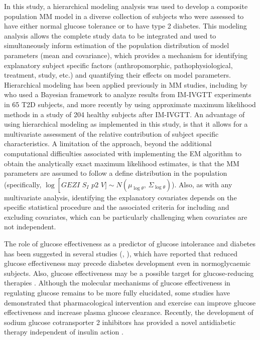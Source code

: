 \documentclass[utf8]{frontiersSCNS} %
\begin{document}
In this study, a hierarchical modeling analysis was used to develop a composite population MM model in a diverse collection of subjects who were assessed to have either normal glucose tolerance or to have type 2 diabetes. This modeling analysis allows the complete study data to be integrated and used to simultaneously inform estimation of the population distribution of model parameters (mean and covariance), which provides a mechanism for identifying explanatory subject specific factors (anthropomorphic, pathophysiological, treatment, study, etc.) and quantifying their effects on model parameters. Hierarchical modeling has been applied previously in MM studies, including by \citet{agbaje_2003} who used a Bayesian framework to analyze results from IM-IVGTT experiments in 65 T2D subjects, and more recently by \citet{Denti2010} using approximate maximum likelihood methods in a study of 204 healthy subjects after IM-IVGTT. An advantage of using hierarchical modeling as implemented in this study, is that it allows for a multivariate assessment of the relative contribution of subject specific characteristics. A limitation of the approach, beyond the additional computational difficulties associated with implementing the EM algorithm to obtain the analytically exact maximum likelihood estimates, is that the MM parameters are assumed to follow a define distribution in the population (specifically, $\log \left[ GEZI\,\,{S_I}\,\,p2\,\,V] \sim N\left( {\mu_{\log \theta }},\,{\Sigma_{\log \theta}} \right)$). Also, as with any multivariate analysis, identifying the explanatory covariates depends on the specific statistical procedure and the associated criteria for including and excluding covariates, which can be particularly challenging when covariates are not independent.

The role of glucose effectiveness as a predictor of glucose intolerance and diabetes has been suggested in several studies (\citet{Martin1992}, \citet{lorenzo_2010}), which have reported that reduced glucose effectiveness may precede diabetes development even in normoglycaemic subjects. Also, glucose effectiveness may be a possible target for glucose-reducing therapies \citep{Ahren_2020}. Although the molecular mechanisms of glucose effectiveness in regulating glucose remains to be more fully elucidated, some studies have demonstrated that pharmacological intervention \citep{pau_2014} and exercise \citep{kar_2017} can improve glucose effectiveness and increase plasma glucose clearance. Recently, the development of sodium glucose cotransporter 2 inhibitors has provided a novel antidiabetic therapy independent of insulin action \citep{SGLT2_2015}. %
\end{document}
